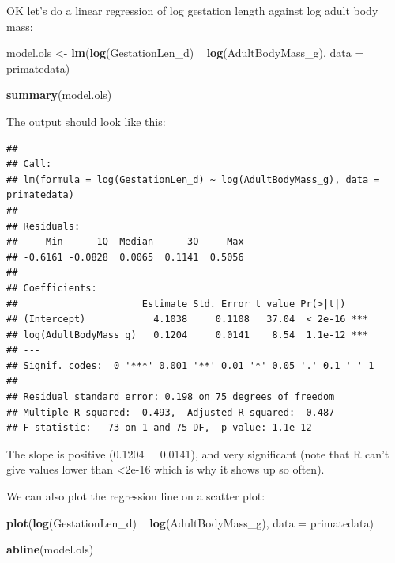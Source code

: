 \documentclass[12pt]{article}
\newcommand{\KeywordTok}[1]{\textcolor[rgb]{0.13,0.29,0.53}{\textbf{{#1}}}}
\newcommand{\DataTypeTok}[1]{\textcolor[rgb]{0.13,0.29,0.53}{{#1}}}
\newcommand{\StringTok}[1]{\textcolor[rgb]{0.31,0.60,0.02}{{#1}}}
\newcommand{\NormalTok}[1]{{#1}}
\begin{document}
OK let's do a linear regression of log gestation length against log adult body mass:

\begin{snugshade}
\begin{Highlighting}[]
\NormalTok{model.ols <-}\StringTok{ }\KeywordTok{lm}\NormalTok{(}\KeywordTok{log}\NormalTok{(GestationLen_d) ~}\StringTok{ }\KeywordTok{log}\NormalTok{(AdultBodyMass_g), }
                \DataTypeTok{data =} \NormalTok{primatedata)}

\KeywordTok{summary}\NormalTok{(model.ols)}
\end{Highlighting}
\end{snugshade}

\newpage
The output should look like this: 

\begin{verbatim}
## 
## Call:
## lm(formula = log(GestationLen_d) ~ log(AdultBodyMass_g), data = primatedata)
## 
## Residuals:
##     Min      1Q  Median      3Q     Max 
## -0.6161 -0.0828  0.0065  0.1141  0.5056 
## 
## Coefficients:
##                      Estimate Std. Error t value Pr(>|t|)    
## (Intercept)            4.1038     0.1108   37.04  < 2e-16 ***
## log(AdultBodyMass_g)   0.1204     0.0141    8.54  1.1e-12 ***
## ---
## Signif. codes:  0 '***' 0.001 '**' 0.01 '*' 0.05 '.' 0.1 ' ' 1
## 
## Residual standard error: 0.198 on 75 degrees of freedom
## Multiple R-squared:  0.493,  Adjusted R-squared:  0.487 
## F-statistic:   73 on 1 and 75 DF,  p-value: 1.1e-12
\end{verbatim}

The slope is positive (0.1204 ± 0.0141), and very significant (note that R can’t give values lower than <2e-16 which is why it shows up so often). 

We can also plot the regression line on a scatter plot:

\begin{snugshade}
\begin{Highlighting}[]
\KeywordTok{plot}\NormalTok{(}\KeywordTok{log}\NormalTok{(GestationLen_d) ~}\StringTok{ }\KeywordTok{log}\NormalTok{(AdultBodyMass_g), }\DataTypeTok{data =} \NormalTok{primatedata)}

\KeywordTok{abline}\NormalTok{(model.ols)}
\end{Highlighting}
\end{snugshade}

 
\end{document}
